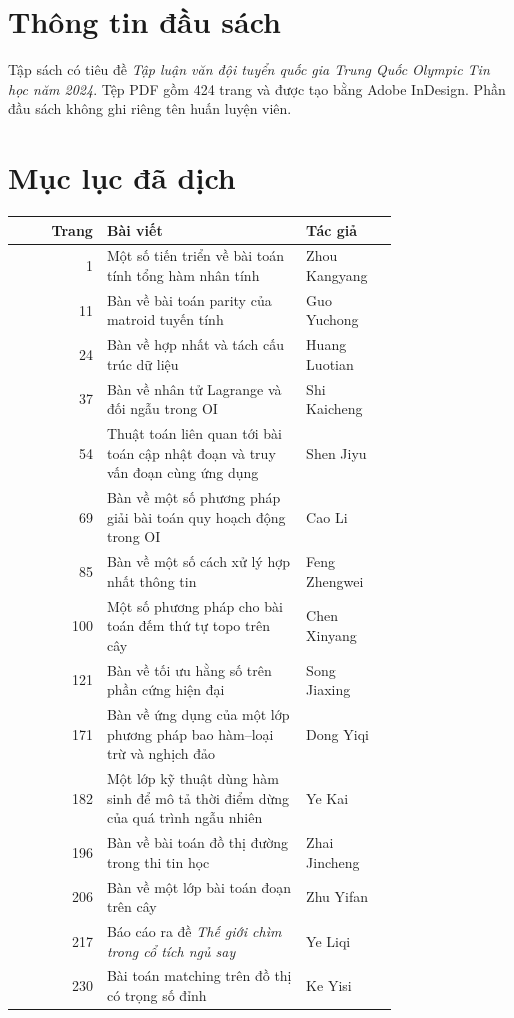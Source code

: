 \documentclass[11pt]{article}
\begin{document}
\section{Thông tin đầu sách}

Tập sách có tiêu đề \emph{Tập luận văn đội tuyển quốc gia Trung Quốc Olympic
Tin học năm 2024}. Tệp PDF gồm 424 trang và được tạo bằng Adobe InDesign. Phần
đầu sách không ghi riêng tên huấn luyện viên.

\section{Mục lục đã dịch}

\begin{center}
\small
\begin{tabular}{r p{0.52\linewidth} p{0.24\linewidth}}
\textbf{Trang} & \textbf{Bài viết} & \textbf{Tác giả} \\
\hline
1 & Một số tiến triển về bài toán tính tổng hàm nhân tính & Zhou Kangyang \\
11 & Bàn về bài toán parity của matroid tuyến tính & Guo Yuchong \\
24 & Bàn về hợp nhất và tách cấu trúc dữ liệu & Huang Luotian \\
37 & Bàn về nhân tử Lagrange và đối ngẫu trong OI & Shi Kaicheng \\
54 & Thuật toán liên quan tới bài toán cập nhật đoạn và truy vấn đoạn cùng ứng dụng & Shen Jiyu \\
69 & Bàn về một số phương pháp giải bài toán quy hoạch động trong OI & Cao Li \\
85 & Bàn về một số cách xử lý hợp nhất thông tin & Feng Zhengwei \\
100 & Một số phương pháp cho bài toán đếm thứ tự topo trên cây & Chen Xinyang \\
121 & Bàn về tối ưu hằng số trên phần cứng hiện đại & Song Jiaxing \\
171 & Bàn về ứng dụng của một lớp phương pháp bao hàm--loại trừ và nghịch đảo & Dong Yiqi \\
182 & Một lớp kỹ thuật dùng hàm sinh để mô tả thời điểm dừng của quá trình ngẫu nhiên & Ye Kai \\
196 & Bàn về bài toán đồ thị đường trong thi tin học & Zhai Jincheng \\
206 & Bàn về một lớp bài toán đoạn trên cây & Zhu Yifan \\
217 & Báo cáo ra đề \emph{Thế giới chìm trong cổ tích ngủ say} & Ye Liqi \\
230 & Bài toán matching trên đồ thị có trọng số đỉnh & Ke Yisi \\

\end{tabular}
\end{center}
\end{document}
